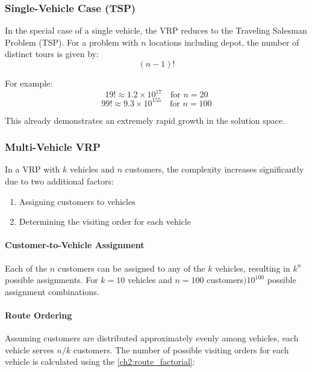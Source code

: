 \documentclass[a4paper]{report}
\begin{document}
{\begin{itemize}
\subsubsection{Single-Vehicle Case (TSP)}

In the special case of a single vehicle, the VRP reduces to the Traveling Salesman Problem (TSP). For a problem with \(n\) locations including depot, the number of distinct tours is given by:
\begin{equation}
    (n-1)!
    \label{ch2:tsp_factorial}
\end{equation}

For example:
\[
19! \approx 1.2 \times 10^{17} \quad \text{for } n = 20
\]
\[
99! \approx 9.3 \times 10^{155} \quad \text{for } n = 100
\]

This already demonstrates an extremely rapid growth in the solution space\cite{n-1!}\cite{factorialGrowth}.

\subsubsection{Multi-Vehicle VRP}

In a VRP with \(k\) vehicles and \(n\) customers, the complexity increases significantly due to two additional factors\cite{MultiVehicle}\cite{twofactor}:

\begin{enumerate}
    \item Assigning customers to vehicles
    \item Determining the visiting order for each vehicle
\end{enumerate}

\paragraph{Customer-to-Vehicle Assignment} 
Each of the \(n\) customers can be assigned to any of the \(k\) vehicles, resulting in  \(k^n\) possible assignments.  
For \(k = 10\) vehicles and \(n = 100\) customers\()
10^{100}
\) possible assignment combinations.

\paragraph{Route Ordering}

Assuming customers are distributed approximately evenly among vehicles, each vehicle serves  \(n/k\) customers. The number of possible visiting orders for each vehicle is calculated using the \ref{ch2:route_factorial}:


\end{itemize}}
\end{document}
